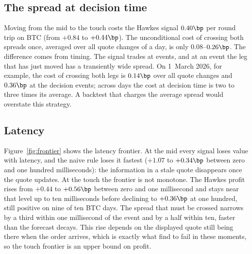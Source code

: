 \documentclass[a4paper,11pt]{article}
\begin{document}
\subsection{The spread at decision time}

Moving from the mid to the touch costs the Hawkes signal $0.40\bp$ per round trip on BTC (from $+0.84$ to $+0.44\bp$). The unconditional cost of crossing both spreads once, averaged over all quote changes of a day, is only $0.08$--$0.26\bp$. The difference comes from timing. The signal trades at events, and at an event the leg that has just moved has a transiently wide spread. On 1~March 2026, for example, the cost of crossing both legs is $0.14\bp$ over all quote changes and $0.36\bp$ at the decision events; across days the cost at decision time is two to three times its average. A backtest that charges the average spread would overstate this strategy.

\subsection{Latency}

Figure~\ref{fig:frontier} shows the latency frontier. At the mid every signal loses value with latency, and the naive rule loses it fastest ($+1.07$ to $+0.34\bp$ between zero and one hundred milliseconds): the information in a stale quote disappears once the quote updates. At the touch the frontier is not monotone. The Hawkes profit rises from $+0.44$ to $+0.56\bp$ between zero and one millisecond and stays near that level up to ten milliseconds before declining to $+0.36\bp$ at one hundred, still positive on nine of ten BTC days. The spread that must be crossed narrows by a third within one millisecond of the event and by a half within ten, faster than the forecast decays. This rise depends on the displayed quote still being there when the order arrives, which is exactly what \cite{albers2025} find to fail in these moments, so the touch frontier is an upper bound on profit.
\end{document}

